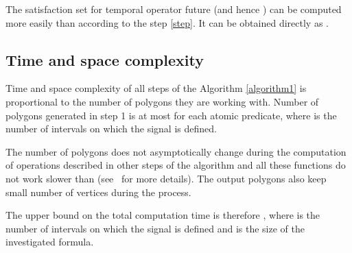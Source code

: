 \begin{remark}

The satisfaction set for temporal operator future  (and hence ) can be computed more easily than according to the step \ref{step}. It can be obtained directly as .


\end{remark}



\subsection{Time and space complexity}
\enlargethispage{8mm}
Time and space complexity of all steps of the Algorithm \ref{algorithm1} is proportional to the number of polygons they are working with. Number of polygons generated in step 1 is at most  for each atomic predicate, where  is the number of intervals on which the signal is defined.

The number of polygons does not asymptotically change during the computation of operations described in other steps of the algorithm and all these functions do not work slower than  (see~\cite{GeometricAlgorithms} for more details). The output polygons also keep small number of vertices during the process.

The upper bound on the total computation time is therefore , where  is the number of intervals on which the signal is defined and  is the size of the investigated formula.  

